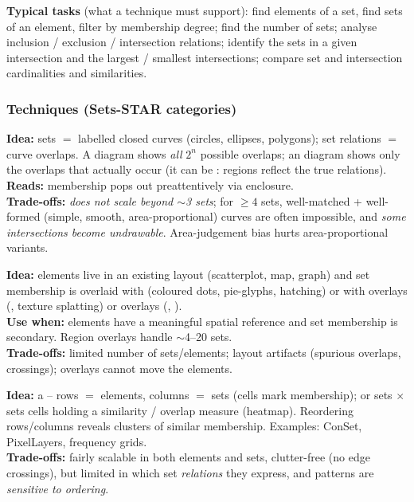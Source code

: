 \textbf{Typical tasks} (what a technique must support): find elements of a set,
find sets of an element, filter by membership degree; find the number of sets;
analyse inclusion / exclusion / intersection relations; identify the sets in a
given intersection and the largest / smallest intersections; compare set and
intersection cardinalities and similarities.

\subsubsection{Techniques (Sets-STAR categories)}

\begin{algobox}
\textbf{Idea:} sets $=$ labelled closed curves (circles, ellipses, polygons);
set relations $=$ curve overlaps. A  diagram shows \emph{all} $2^n$
possible overlaps; an  diagram shows only the overlaps that
actually occur (it can be : regions reflect the true
relations).\\
\textbf{Reads:} membership pops out preattentively via enclosure.\\
\textbf{Trade-offs:} \emph{does not scale beyond $\sim$3 sets}; for $\ge 4$
sets, well-matched + well-formed (simple, smooth, area-proportional) curves are
often impossible, and \emph{some intersections become undrawable}. Area-judgement
bias hurts area-proportional variants.
\end{algobox}

\begin{algobox}
\textbf{Idea:} elements live in an existing layout (scatterplot, map, graph)
and set membership is overlaid with  (coloured dots,
pie-glyphs, hatching) or with  overlays (,
texture splatting) or  overlays (, ).\\
\textbf{Use when:} elements have a meaningful spatial reference and set
membership is secondary. Region overlays handle $\sim$4--20 sets.\\
\textbf{Trade-offs:} limited number of sets/elements; layout artifacts
(spurious overlaps, crossings); overlays cannot move the elements.
\end{algobox}

\begin{algobox}
\textbf{Idea:} a  -- rows $=$ elements, columns $=$
sets (cells mark membership); or sets $\times$ sets cells holding a similarity /
overlap measure (heatmap). Reordering rows/columns reveals clusters of similar
membership. Examples: ConSet, PixelLayers, frequency grids.\\
\textbf{Trade-offs:} fairly scalable in both elements and sets, clutter-free
(no edge crossings), but limited in which set \emph{relations} they express,
and patterns are \emph{sensitive to ordering}.
\end{algobox}

